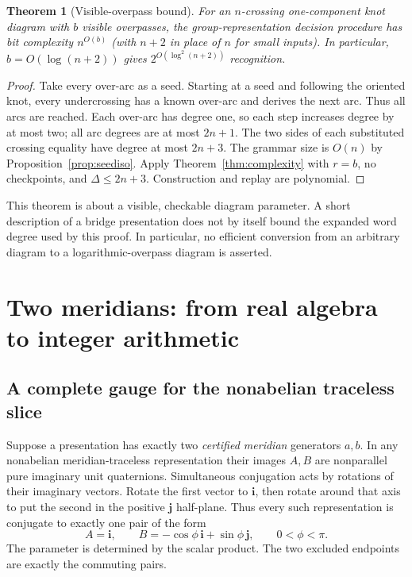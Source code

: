 \documentclass[11pt]{article}
\newtheorem{theorem}{Theorem}[section]
\theoremstyle{definition}
\theoremstyle{remark}
\begin{document}
\begin{theorem}[Visible-overpass bound]
\label{thm:overpasses}
For an $n$-crossing one-component knot diagram with $b$ visible overpasses, the group-representation decision procedure has bit complexity $n^{O(b)}$ (with $n+2$ in place of $n$ for small inputs). In particular, $b=O(\log(n+2))$ gives $2^{O(\log^2(n+2))}$ recognition.
\end{theorem}
\begin{proof}
Take every over-arc as a seed. Starting at a seed and following the oriented knot, every undercrossing has a known over-arc and derives the next arc. Thus all arcs are reached. Each over-arc has degree one, so each step increases degree by at most two; all arc degrees are at most $2n+1$. The two sides of each substituted crossing equality have degree at most $2n+3$. The grammar size is $O(n)$ by Proposition~\ref{prop:seediso}. Apply Theorem~\ref{thm:complexity} with $r=b$, no checkpoints, and $\Delta\le2n+3$. Construction and replay are polynomial.
\end{proof}

This theorem is about a visible, checkable diagram parameter. A short description of a bridge presentation does not by itself bound the expanded word degree used by this proof. In particular, no efficient conversion from an arbitrary diagram to a logarithmic-overpass diagram is asserted.

\section{Two meridians: from real algebra to integer arithmetic}
\label{sec:dihedral}

\subsection{A complete gauge for the nonabelian traceless slice}
Suppose a presentation has exactly two \emph{certified meridian} generators $a,b$. In any nonabelian meridian-traceless representation their images $A,B$ are nonparallel pure imaginary unit quaternions. Simultaneous conjugation acts by rotations of their imaginary vectors. Rotate the first vector to $\mathbf i$, then rotate around that axis to put the second in the positive $\mathbf j$ half-plane. Thus every such representation is conjugate to exactly one pair of the form
\begin{equation}
A=\mathbf i,\qquad B=-\cos\phi\,\mathbf i+\sin\phi\,\mathbf j,
\qquad 0<\phi<\pi.
\label{eq:gauge}
\end{equation}
The parameter is determined by the scalar product. The two excluded endpoints are exactly the commuting pairs.
\end{document}
